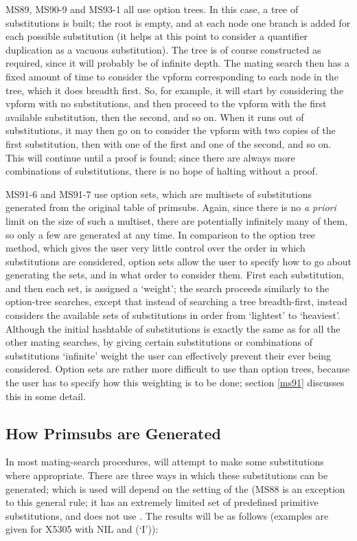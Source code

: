 MS89, MS90-9 and MS93-1 all use option trees. In this case, a tree of substitutions is built;
the root is empty, and at each node one branch is added for each possible substitution (it helps at
this point to consider a quantifier duplication as a vacuous substitution). The tree is of course
constructed as required, since it will probably be of infinite depth. The mating search then has a fixed
amount of time to consider the vpform corresponding to each node in the tree, which it does breadth first.
So, for example, it will start by considering the vpform with no substitutions, and then proceed to
the vpform with the first available substitution, then the second, and so on. When it runs out of substitutions,
it may then go on to consider the vpform with two copies of the first substitution, then with one of the first
and one of the second, and so on. This will continue until a proof is found; since there are always more
combinations of substitutions, there is no hope of halting without a proof.

MS91-6 and MS91-7 use option sets, which are multisets of substitutions generated from the original table of primsubs.
Again, since there is no {\it a priori} limit on the size of such a multiset, there are potentially infinitely
many of them, so only a few are generated at any time. In comparison to the option tree method, which gives the
user very little control over
the order in which substitutions are considered, option sets allow the user to specify how to go about
generating the sets, and in what order to consider them. First each substitution, and then each set,
is assigned a `weight'; the search proceeds
similarly to the option-tree searches, except that instead of searching a tree breadth-first, {\TPS} instead
considers the available sets of substitutions in order from `lightest' to `heaviest'.
Although the initial hashtable of substitutions is exactly the same as for all the other mating searches,
by giving certain substitutions or combinations of substitutions `infinite' weight the user can
effectively prevent their ever being considered. Option sets are rather more difficult to use than
option trees, because the user has to specify how this weighting is to be done; section \ref{ms91}
discusses this in some detail.

\subsection{How Primsubs are Generated}

In most mating-search procedures, {\TPS} will attempt to make some substitutions
where appropriate. There are three ways in which these substitutions can be generated;
which is used will depend on the setting of the  (MS88 is an exception
to this general rule; it has an extremely limited set of predefined primitive substitutions,
and does not use . The results will
be as follows (examples are given for X5305 with  NIL and
 (`I')):

